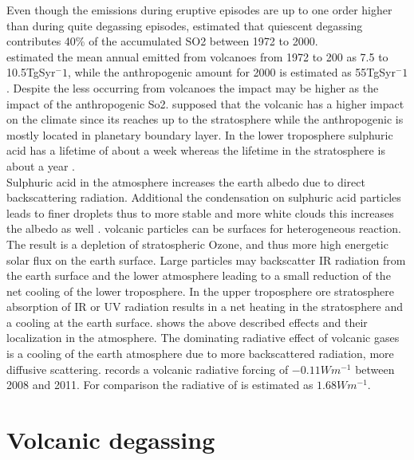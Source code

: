 \documentclass  [
  paper    = a4,
  BCOR     = 10mm,
  twoside,
  fontsize = 12pt,
  fleqn,
  toc      = bibnumbered,
  toc      = listofnumbered,
  numbers  = noendperiod,
  headings = normal,
  listof   = leveldown,
  version  = 3.03
]                                       {scrreprt}
\begin{document}
Even though the emissions during eruptive episodes are up to one order higher than during quite degassing episodes, \cite{halmer2002annual} estimated that quiescent degassing contributes 40\% of the accumulated SO2 between 1972 to 2000.\\
\cite{halmer2002annual} estimated the mean annual   emitted from volcanoes from 1972 to 200 as 7.5 to 10.5TgSyr$^-1$, while the anthropogenic   amount for 2000 is estimated as 55TgSyr$^-1$ \citep{IPCC}. Despite the less   occurring from volcanoes the impact may be higher as the impact of the anthropogenic So2. \cite{graf1997volcanic} supposed that the volcanic   has a higher impact on the climate since its reaches up to the stratosphere while the anthropogenic   is mostly located in planetary boundary layer. In the lower troposphere sulphuric acid has a lifetime of about a week whereas the lifetime in the stratosphere is about a year \citep{IPCC}.\\
Sulphuric acid in the atmosphere increases the earth albedo due to direct backscattering radiation. Additional the condensation on sulphuric acid particles leads to finer droplets thus to more stable and more white clouds this increases the albedo as well \citep{twomey1974pollution}.
volcanic particles can be surfaces for heterogeneous reaction. The result is a depletion of stratospheric Ozone, and thus more high energetic solar flux on the earth surface.
Large particles may backscatter IR radiation from the earth surface and the lower atmosphere leading to a small reduction of the net cooling of the lower troposphere.
In the upper troposphere ore stratosphere absorption of IR or UV radiation results in a net heating in the stratosphere and a cooling at the earth surface.
 shows the above described effects and their localization in the atmosphere.
The dominating radiative effect of volcanic gases is a cooling of the earth atmosphere due to  more backscattered radiation, more diffusive scattering\citep{robock2000volcanic}.
\cite{IPCC} records a volcanic radiative forcing of $-0.11Wm^{-1}$ between 2008 and 2011. For comparison the radiative of   is estimated as  $1.68Wm^{-1}$.





\section{Volcanic degassing}
\end{document}
